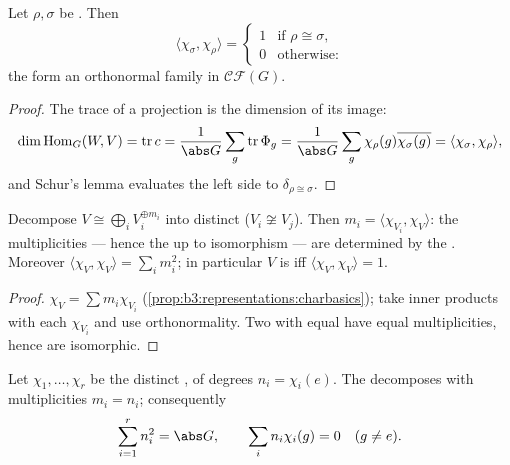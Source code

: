 \begin{theorem}
\label{thm:b3:representations:orthogonality}
Let $\rho, \sigma$ be \emph{}. Then
\[
\langle\chi_\sigma, \chi_\rho\rangle =
\begin{cases}
1 & \text{if } \rho \cong \sigma,\\
0 & \text{otherwise:}
\end{cases}
\]
the   form an orthonormal family in
$\mathcal{CF}(G)$.
\end{theorem}

\begin{proof}
The trace of a projection is the dimension of its image:
\[
\dim\operatorname{Hom}_G(W, V) = \operatorname{tr} c
= \frac1{\abs G}\sum_g \operatorname{tr}\Phi_g
= \frac1{\abs G}\sum_g \chi_\rho(g)\overline{\chi_\sigma(g)}
= \langle \chi_\sigma, \chi_\rho\rangle,
\]
and Schur's lemma evaluates the left side to $\delta_{\rho \cong
\sigma}$.
\end{proof}

\begin{corollary}\label{cor:b3:representations:multiplicity}
Decompose $V \cong \bigoplus_i V_i^{\oplus m_i}$ into distinct
 ($V_i \not\cong V_j$). Then $m_i = \langle
\chi_{V_i}, \chi_V\rangle$: the multiplicities --- hence the
 up to isomorphism --- are determined by the
. Moreover $\langle \chi_V, \chi_V\rangle = \sum_i
m_i^2$; in particular $V$ is  iff $\langle\chi_V,
\chi_V\rangle = 1$.
\end{corollary}

\begin{proof}
$\chi_V = \sum m_i\chi_{V_i}$
(\cref{prop:b3:representations:charbasics}); take inner products
with each $\chi_{V_i}$ and use orthonormality. Two
 with equal  have equal multiplicities,
hence are isomorphic.
\end{proof}

\begin{theorem}
\label{thm:b3:representations:regular}
Let $\chi_1, \dots, \chi_r$ be the distinct 
, of degrees $n_i = \chi_i(e)$. The  decomposes with multiplicities $m_i = n_i$;
consequently
\[
\sum_{i=1}^{r} n_i^2 = \abs G,
\qquad
\sum_i n_i\chi_i(g) = 0 \quad (g \neq e).
\]
\end{theorem}

